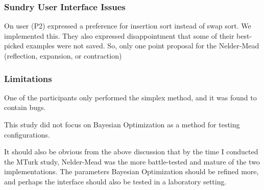 \subsubsection{Sundry User Interface Issues}

On user (P2) expressed a preference for insertion sort instead of swap sort.
We implemented this.
They also expressed disappointment that some of their best-picked examples were not saved.
So, only one point proposal for the Nelder-Mead (reflection, expansion, or contraction)

\subsubsection{Limitations}

One of the participants only performed the simplex method, and it was found to contain bugs.

This study did not focus on Bayesian Optimization as a method for testing configurations.

It should also be obvious from the above discussion that by the time I conducted the MTurk study, Nelder-Mead was the more battle-tested and mature of the two implementations.
The parameters Bayesian Optimization should be refined more, and perhaps the interface should also be tested in a laboratory setting.

